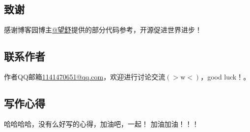 \documentclass[12pt,a4,utf8]{article}
\begin{document}
\newpage
\subsection{致谢}
感谢博客园博主\href{https://www.cnblogs.com/huangliu1111/p/13625826.html}{@望舒}提供的部分代码参考，开源促进世界进步！
\subsection{联系作者}
作者QQ邮箱\href{https://wx.mail.qq.com/?cancel_login=true&from=get_ticket_fail}{1141470651@qq.com}，欢迎进行讨论交流$(>\text{w}<)$，good luck！。

\subsection{写作心得}
哈哈哈哈，没有么好写的心得，加油吧，一起！
加油加油！！！

\end{document}
